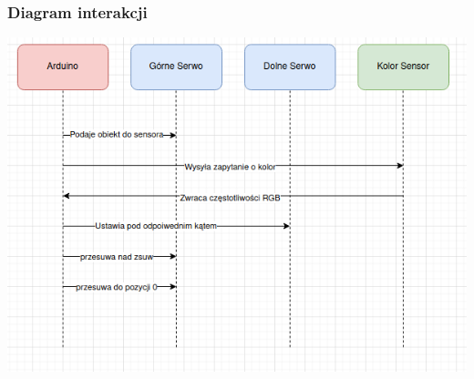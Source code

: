 \documentclass[12pt]{article}
\begin{document}
\subsubsection{Diagram interakcji}
\hspace{-2.75cm}%
    \includegraphics[scale=0.8]{inter.png}
\end{document}
